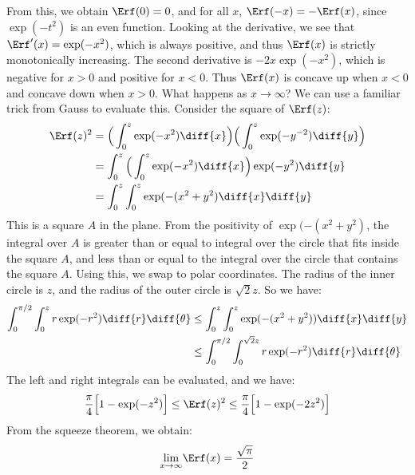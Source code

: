 \documentclass[crop=false,class=book,oneside]{standalone}
\begin{document}
        From this, we obtain $\Erf(0)=0$, and for all
        $x$, $\Erf(-x)=-\Erf(x)$, since $\exp(-t^{2})$ is an
        even function. Looking at the derivative, we see that
        $\Erf'(x)=\exp(-x^{2})$, which is always positive, and
        thus $\Erf(x)$ is strictly monotonically increasing.
        The second derivative is $-2x\exp(-x^{2})$, which is
        negative for $x>0$ and positive for $x<0$. Thus $\Erf(x)$
        is concave up when $x<0$ and concave down when $x>0$.
        What happens as $x\rightarrow\infty$? We can use a
        familiar trick from Gauss to evaluate this. Consider
        the square of $\Erf(z)$:
        \begin{align}
            \Erf(z)^{2}
            &=\Big(\int_{0}^{z}\exp(-x^{2})\diff{x}\Big)
            \Big(\int_{0}^{z}\exp(-y^{-2})\diff{y}\Big)\\
            &=\int_{0}^{z}
                \Big(\int_{0}^{z}\exp(-x^{2})\diff{x}\Big)
                \exp(-y^{2})\diff{y}\\
            &=\int_{0}^{z}\int_{0}^{z}\exp(-(x^{2}+y^{2})
                \diff{x}\diff{y}
        \end{align}
        This is a square $A$ in the plane. From the positivity of
        $\exp(-(x^{2}+y^{2})$, the integral over $A$ is greater
        than or equal to integral over the circle that fits
        inside the square $A$, and less than or equal to the
        integral over the circle that contains the square $A$.
        Using this, we swap to polar coordinates. The radius
        of the inner circle is $z$, and the radius of the
        outer circle is $\sqrt{2}z$. So we have:
        \begin{align}
            \int_{0}^{\pi/2}\int_{0}^{z}r\exp(-r^{2})
                \diff{r}\diff{\theta}
            &\leq\int_{0}^{z}\int_{0}^{z}\exp(-(x^{2}+y^{2}))
                \diff{x}\diff{y}\\
            &\leq\int_{0}^{\pi/2}\int_{0}^{\sqrt{2}z}r\exp(-r^{2})
                \diff{r}\diff{\theta}
        \end{align}
        The left and right integrals can be evaluated, and we
        have:
        \begin{equation}
            \frac{\pi}{4}\Big[1-\exp(-z^{2})\Big]
            \leq\Erf(z)^{2}
            \leq\frac{\pi}{4}\Big[1-\exp(-2z^{2})\Big]
        \end{equation}
        From the squeeze theorem, we obtain:
        \begin{equation}
            \underset{x\rightarrow\infty}{\lim}
            \Erf(x)=\frac{\sqrt{\pi}}{2}
        \end{equation}
\end{document}
